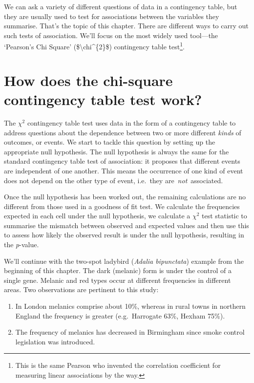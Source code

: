 \documentclass[
]{book}
\providecommand{\tightlist}{%
  \setlength{\itemsep}{0pt}\setlength{\parskip}{0pt}}
\begin{document}
We can ask a variety of different questions of data in a contingency table, but they are usually used to test for associations between the variables they summarise. That's the topic of this chapter. There are different ways to carry out such tests of association. We'll focus on the most widely used tool---the `Pearson's Chi Square' (\$\textbackslash chi\^{}\{2\}\$) contingency table test\footnote{This is the same Pearson who invented the correlation coefficient for measuring linear associations by the way.}.

\hypertarget{how-does-the-chi-square-contingency-table-test-work}{%
\section{How does the chi-square contingency table test work?}\label{how-does-the-chi-square-contingency-table-test-work}}

The \(\chi^{2}\) contingency table test uses data in the form of a contingency table to address questions about the dependence between two or more different \emph{kinds} of outcomes, or events. We start to tackle this question by setting up the appropriate null hypothesis. The null hypothesis is always the same for the standard contingency table test of association: it proposes that different events are independent of one another. This means the occurrence of one kind of event does not depend on the other type of event, i.e.~they are~\emph{not}~associated.

Once the null hypothesis has been worked out, the remaining calculations are no different from those used in a goodness of fit test. We calculate the frequencies expected in each cell under the null hypothesis, we calculate a \(\chi^{2}\) test statistic to summarise the mismatch between observed and expected values and then use this to assess how likely the observed result is under the null hypothesis, resulting in the \emph{p}-value.

We'll continue with the two-spot ladybird (\emph{Adalia bipunctata}) example from the beginning of this chapter. The dark (melanic) form is under the control of a single gene. Melanic and red types occur at different frequencies in different areas. Two observations are pertinent to this study:

\begin{enumerate}
\def\labelenumi{\arabic{enumi}.}
\tightlist
\item
  In London melanics comprise about 10\%, whereas in rural towns in northern England the frequency is greater (e.g.~Harrogate 63\%, Hexham 75\%).
\item
  The frequency of melanics has decreased in Birmingham since smoke control legislation was introduced.
\end{enumerate}
\end{document}
